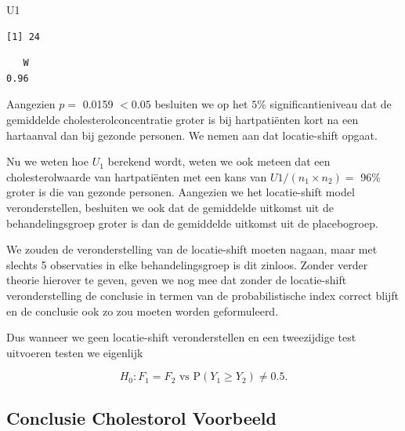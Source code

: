\documentclass[
  dutch,
  letterpaper,
  12pt]{book}
\newenvironment{Shaded}{\begin{snugshade}}{\end{snugshade}}
\newcommand{\FunctionTok}[1]{\textcolor[rgb]{0.28,0.35,0.67}{#1}}
\newcommand{\NormalTok}[1]{\textcolor[rgb]{0.00,0.23,0.31}{#1}}
\newcommand{\OtherTok}[1]{\textcolor[rgb]{0.00,0.23,0.31}{#1}}
\newcommand{\SpecialCharTok}[1]{\textcolor[rgb]{0.37,0.37,0.37}{#1}}
\theoremstyle{definition}
\theoremstyle{definition}
\theoremstyle{definition}
\theoremstyle{remark}
\begin{document}
\begin{Shaded}
\begin{Highlighting}[]
\NormalTok{U1}
\end{Highlighting}
\end{Shaded}

\begin{verbatim}
[1] 24
\end{verbatim}

\begin{Shaded}
\end{Shaded}

\begin{verbatim}
   W 
0.96 
\end{verbatim}

Aangezien \(p=\) 0.0159 \(<0.05\) besluiten we op het \(5\%\)
significantieniveau dat de gemiddelde cholesterolconcentratie groter is
bij hartpatiënten kort na een hartaanval dan bij gezonde personen. We
nemen aan dat locatie-shift opgaat.

Nu we weten hoe \(U_1\) berekend wordt, weten we ook meteen dat een
cholesterolwaarde van hartpatiënten met een kans van
\(U1/(n_1\times n_2)=\) 96\% groter is die van gezonde personen.
Aangezien we het locatie-shift model veronderstellen, besluiten we ook
dat de gemiddelde uitkomst uit de behandelingsgroep groter is dan de
gemiddelde uitkomst uit de placebogroep.

We zouden de veronderstelling van de locatie-shift moeten nagaan, maar
met slechts 5 observaties in elke behandelingsgroep is dit zinloos.
Zonder verder theorie hierover te geven, geven we nog mee dat zonder de
locatie-shift veronderstelling de conclusie in termen van de
probabilistische index correct blijft en de conclusie ook zo zou moeten
worden geformuleerd.

Dus wanneer we geen locatie-shift veronderstellen en een tweezijdige
test uitvoeren testen we eigenlijk

\[H_0: F_1=F_2 \text{ vs P}(Y_1 \geq Y_2) \neq 0.5.\]

\subsection{Conclusie Cholestorol
Voorbeeld}\label{conclusie-cholestorol-voorbeeld}
\end{document}

